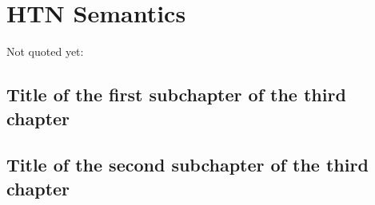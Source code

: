 \chapter{{HTN} Semantics}

Not quoted yet: \cite{inproceedings}

\section{Title of the first subchapter of the third chapter}

\section{Title of the second subchapter of the third chapter}